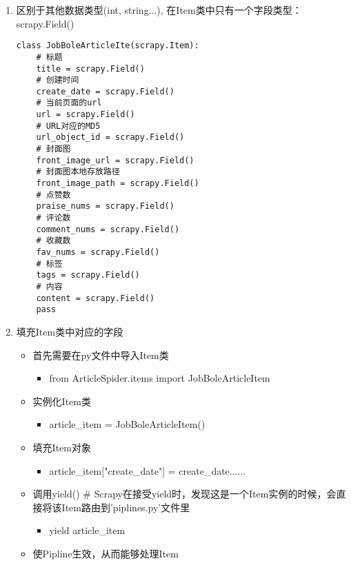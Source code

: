\documentclass[11pt]{article}
\providecommand{\tightlist}{%
      \setlength{\itemsep}{0pt}\setlength{\parskip}{0pt}}
\begin{document}
    \begin{enumerate}
\def\labelenumi{\arabic{enumi}.}
\item
  区别于其他数据类型(int, string...),
  在Item类中只有一个字段类型：scrapy.Field()

\begin{verbatim}
class JobBoleArticleIte(scrapy.Item):
    # 标题
    title = scrapy.Field()
    # 创建时间
    create_date = scrapy.Field()
    # 当前页面的url
    url = scrapy.Field()
    # URL对应的MD5
    url_object_id = scrapy.Field()
    # 封面图
    front_image_url = scrapy.Field()
    # 封面图本地存放路径
    front_image_path = scrapy.Field()
    # 点赞数
    praise_nums = scrapy.Field()
    # 评论数
    comment_nums = scrapy.Field()
    # 收藏数
    fav_nums = scrapy.Field()
    # 标签
    tags = scrapy.Field()
    # 内容
    content = scrapy.Field()
    pass
\end{verbatim}
\item
  填充Item类中对应的字段

  \begin{itemize}
  \item
    首先需要在py文件中导入Item类

    \begin{itemize}
    \tightlist
    \item
      from ArticleSpider.items import JobBoleArticleItem
    \end{itemize}
  \item
    实例化Item类

    \begin{itemize}
    \tightlist
    \item
      article\_item = JobBoleArticleItem()
    \end{itemize}
  \item
    填充Item对象

    \begin{itemize}
    \tightlist
    \item
      article\_item{[}"create\_date"{]} = create\_date......
    \end{itemize}
  \item
    调用yield() \#
    Scrapy在接受yield时，发现这是一个Item实例的时候，会直接将该Item路由到'piplines.py'文件里

    \begin{itemize}
    \tightlist
    \item
      yield article\_item
    \end{itemize}
  \item
    使Pipline生效，从而能够处理Item


\end{itemize}
\end{enumerate}
\end{document}
